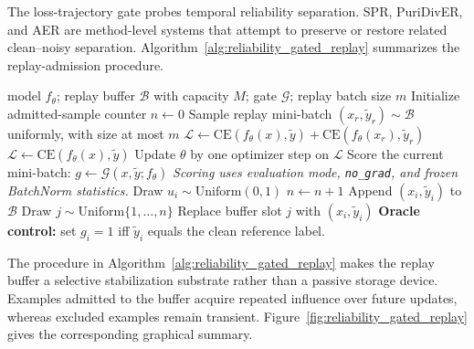 \documentclass[preprint,12pt]{elsarticle}
\begin{document}
The loss-trajectory gate probes temporal reliability separation. SPR, PuriDivER, and AER are method-level systems that attempt to preserve or restore related clean--noisy separation. Algorithm~\ref{alg:reliability_gated_replay} summarizes the replay-admission procedure.

\begin{algorithm}[H]
\caption{Reliability-gated replay for one task}
\label{alg:reliability_gated_replay}
\small
\begin{algorithmic}[1]
\Require model $f_\theta$; replay buffer $\mathcal{B}$ with capacity $M$; gate $\mathcal{G}$; replay batch size $m$
\State Initialize admitted-sample counter $n\gets 0$
        \State Sample replay mini-batch $(x_r,\tilde{y}_r)\sim\mathcal{B}$ uniformly, with size at most $m$
        \State $\mathcal{L}\gets \mathrm{CE}(f_\theta(x),\tilde{y})+\mathrm{CE}(f_\theta(x_r),\tilde{y}_r)$
    \Else
        \State $\mathcal{L}\gets \mathrm{CE}(f_\theta(x),\tilde{y})$
    \EndIf
    \State Update $\theta$ by one optimizer step on $\mathcal{L}$
    \State Score the current mini-batch: $g\gets\mathcal{G}(x,\tilde{y};f_\theta)$
    \Statex \hspace{\algorithmicindent}\textit{Scoring uses evaluation mode, \texttt{no\_grad}, and frozen BatchNorm statistics.}
        \State Draw $u_i\sim\mathrm{Uniform}(0,1)$
            \State $n\gets n+1$
                \State Append $(x_i,\tilde{y}_i)$ to $\mathcal{B}$
            \Else
                \State Draw $j\sim\mathrm{Uniform}\{1,\ldots,n\}$
                    \State Replace buffer slot $j$ with $(x_i,\tilde{y}_i)$
                \EndIf
            \EndIf
        \EndIf
    \EndFor
\EndFor
\Statex \textbf{Oracle control:} set $g_i=1$ iff $\tilde{y}_i$ equals the clean reference label.
\end{algorithmic}
\end{algorithm}

The procedure in Algorithm~\ref{alg:reliability_gated_replay} makes the replay buffer a selective stabilization substrate rather than a passive storage device. Examples admitted to the buffer acquire repeated influence over future updates, whereas excluded examples remain transient. Figure~\ref{fig:reliability_gated_replay} gives the corresponding graphical summary.
\end{document}
